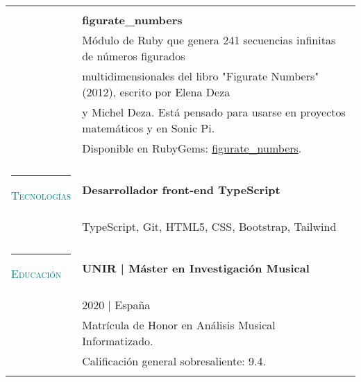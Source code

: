 \documentclass[letterpaper,10pt,oneside]{article}
\begin{document}
\begin{tabular}{@{}l l}
    & \\
    & \textbf{figurate\_numbers} \\
    & Módulo de Ruby que genera 241 secuencias infinitas  de números figurados \\ &multidimensionales del libro "Figurate Numbers" (2012), escrito por Elena Deza \\ &  y Michel Deza.  Está pensado para usarse en proyectos matemáticos y en Sonic Pi.  \\ & Disponible en RubyGems: \href{https://rubygems.org/gems/figurate_numbers }{figurate\_numbers}.\\
    & \\



    \textcolor{teal}{\rule{0.4em}{7pt}}
    \scshape{\textcolor{teal}{Tecnologías}}

    & \textbf{Desarrollador front-end TypeScript} \\
    & TypeScript, Git, HTML5, CSS, Bootstrap, Tailwind  \\
    & \\



    \textcolor{teal}{\rule{0.4em}{7pt}}
    \scshape{\textcolor{teal}{Educación}}
    & \textbf{UNIR |  Máster en Investigación Musical} \\
     & 2020 | España \\
     & Matrícula de Honor en Análisis Musical Informatizado.  \\
     & Calificación general sobresaliente: 9.4. \\
     & \\



\end{tabular}
\end{document}
